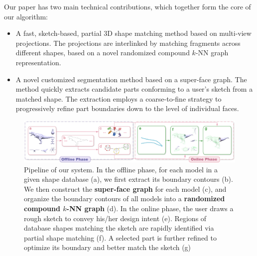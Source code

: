 Our paper has two main technical contributions, which together form the core of our algorithm:
\begin{itemize}
\setlength{\itemsep}{3pt}
\setlength{\parskip}{0pt}
\setlength{\parsep}{0pt}
\item A fast, sketch-based, partial 3D shape matching method based on multi-view projections. The projections are interlinked by matching fragments across different shapes, based on a novel randomized compound $k$-NN graph representation.
\item A novel customized segmentation method based on a super-face graph. The method quickly extracts candidate parts conforming to a user's sketch from a matched shape. The extraction employs a coarse-to-fine strategy to progressively refine part boundaries down to the level of individual faces.
\end{itemize}

\begin{figure}[t]
\centering
\includegraphics[width=\linewidth]{./Material/Pipeline.pdf}
\caption{Pipeline of our system. In the offline phase, for each model in a given shape database (a), we first extract its boundary contours (b). We then construct the \textbf{super-face graph} for each model (c), and organize the boundary contours of all models into a \textbf{randomized compound $k$-NN graph} (d). In the online phase, the user draws a rough sketch to convey his/her design intent (e). Regions of database shapes matching the sketch are rapidly identified via partial shape matching (f). A selected part is further refined to optimize its boundary and better match the sketch (g)}\label{fig:pipeline}
\end{figure}
